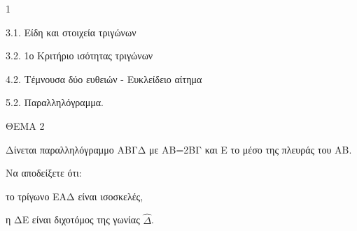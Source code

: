 \begin{ylh}{1}
    \item 3.1. Είδη και στοιχεία τριγώνων
    \item 3.2. 1ο Κριτήριο ισότητας τριγώνων
    \item 4.2. Τέμνουσα δύο ευθειών - Ευκλείδειο αίτημα
    \item 5.2. Παραλληλόγραμμα.
\end{ylh}

ΘΕΜΑ 2

Δίνεται παραλληλόγραμμο ΑΒΓΔ με ΑΒ=2ΒΓ και Ε το μέσο της πλευράς του ΑΒ.

Να αποδείξετε ότι:

\begin{alist}
\item το τρίγωνο ΕΑΔ είναι ισοσκελές, 

\item η ΔΕ είναι διχοτόμος της γωνίας $\widehat{\Delta}$. 

\begin{center}
\end{center}
\end{alist}
